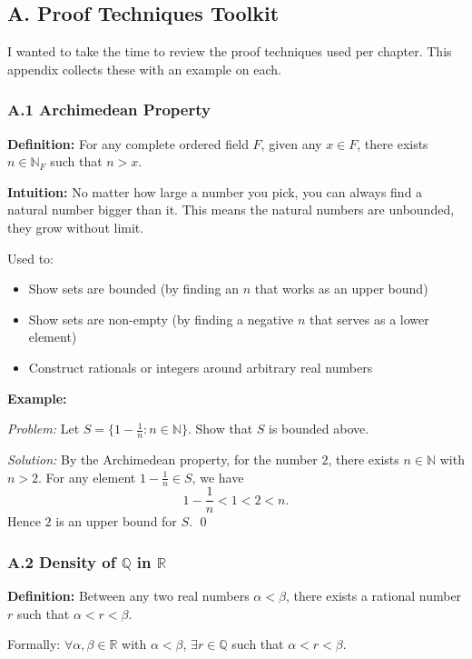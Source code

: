 \newpage
\subsection*{A. Proof Techniques Toolkit}

I wanted to take the time to review the proof techniques used per chapter. This appendix collects these with an example on each.

\subsubsection*{A.1 Archimedean Property}

\textbf{Definition:}
For any complete ordered field $F$, given any $x \in F$, there exists $n \in \mathbb{N}_F$ such that $n > x$.

\textbf{Intuition:}
No matter how large a number you pick, you can always find a natural number bigger than it. This means the natural numbers are unbounded, they grow without limit.

Used to:
\begin{itemize}
    \item Show sets are bounded (by finding an $n$ that works as an upper bound)
    \item Show sets are non-empty (by finding a negative $n$ that serves as a lower element)
    \item Construct rationals or integers around arbitrary real numbers
\end{itemize}

\textbf{Example:}

\textit{Problem:} Let $S = \{1 - \frac{1}{n} : n \in \mathbb{N}\}$. Show that $S$ is bounded above.

\textit{Solution:} By the Archimedean property, for the number $2$, there exists $n \in \mathbb{N}$ with $n > 2$. For any element $1 - \frac{1}{n} \in S$, we have 
\[1 - \frac{1}{n} < 1 < 2 < n.\]
Hence $2$ is an upper bound for $S$. \qed

\subsubsection*{A.2 Density of $\mathbb{Q}$ in $\mathbb{R}$}

\textbf{Definition:}
Between any two real numbers $\alpha < \beta$, there exists a rational number $r$ such that $\alpha < r < \beta$.

Formally: $\forall \alpha, \beta \in \mathbb{R}$ with $\alpha < \beta$, $\exists r \in \mathbb{Q}$ such that $\alpha < r < \beta$.


